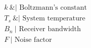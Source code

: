 \documentclass[preview]{standalone}
\begin{document}
\begin{align*}
&k\  \text{&| Boltzmann's constant} \\ &T_s\  \text{&| System temperature} \\ &B_n\  \text{| Receiver bandwidth} \\ &F\  \text{| Noise factor}
\end{align*}
\end{document}
